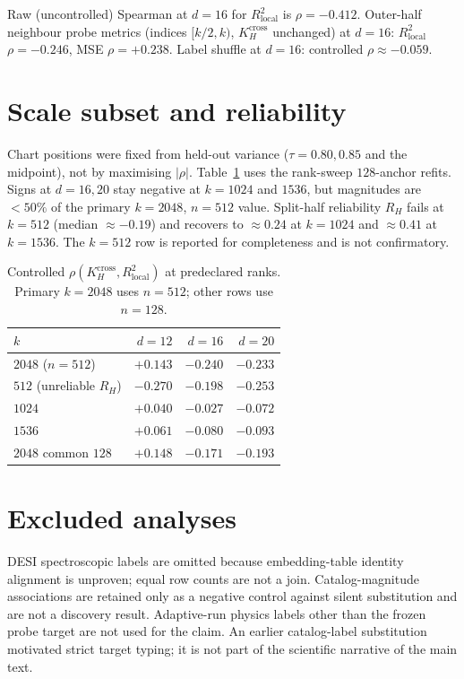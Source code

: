 \documentclass[mlabstract]{jmlr}
\begin{document}
Raw (uncontrolled) Spearman at $d{=}16$ for $R^{2}_{\mathrm{local}}$ is $\rho{=}-0.412$. Outer-half neighbour probe metrics (indices $[k/2,k)$, $K_H^{\mathrm{cross}}$ unchanged) at $d{=}16$: $R^{2}_{\mathrm{local}}$ $\rho{=}-0.246$, MSE $\rho{=}+0.238$. Label shuffle at $d{=}16$: controlled $\rho{\approx}-0.059$.

\section{Scale subset and reliability}
\label{app:scale}

Chart positions were fixed from held-out variance ($\tau{=}0.80,0.85$ and the midpoint), not by maximising $|\rho|$. Table~\ref{tab:scale} uses the rank-sweep $128$-anchor refits. Signs at $d{=}16,20$ stay negative at $k{=}1024$ and $1536$, but magnitudes are ${<}50\%$ of the primary $k{=}2048$, $n{=}512$ value. Split-half reliability $R_{H}$ fails at $k{=}512$ (median $\approx-0.19$) and recovers to $\approx0.24$ at $k{=}1024$ and $\approx0.41$ at $k{=}1536$. The $k{=}512$ row is reported for completeness and is not confirmatory.

\begin{table}[h]
\caption{Controlled $\rho(K_H^{\mathrm{cross}},R^{2}_{\mathrm{local}})$ at predeclared ranks. Primary $k{=}2048$ uses $n{=}512$; other rows use $n{=}128$.}
\label{tab:scale}
\centering
\footnotesize
\begin{tabular}{lrrr}
\toprule
$k$ & $d{=}12$ & $d{=}16$ & $d{=}20$ \\
\midrule
$2048$ ($n{=}512$) & $+0.143$ & $-0.240$ & $-0.233$ \\
$512$ (unreliable $R_H$) & $-0.270$ & $-0.198$ & $-0.253$ \\
$1024$ & $+0.040$ & $-0.027$ & $-0.072$ \\
$1536$ & $+0.061$ & $-0.080$ & $-0.093$ \\
$2048$ common $128$ & $+0.148$ & $-0.171$ & $-0.193$ \\
\bottomrule
\end{tabular}
\end{table}

\section{Excluded analyses}
\label{app:excluded}

DESI spectroscopic labels are omitted because embedding-table identity alignment is unproven; equal row counts are not a join. Catalog-magnitude associations are retained only as a negative control against silent substitution and are not a discovery result. Adaptive-run physics labels other than the frozen probe target are not used for the claim. An earlier catalog-label substitution motivated strict target typing; it is not part of the scientific narrative of the main text.
 
\end{document}
